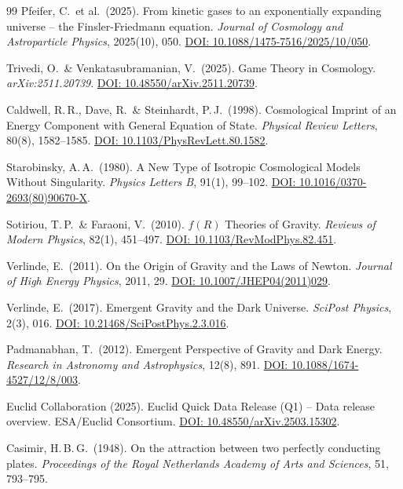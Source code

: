 \documentclass[aps,prd,twocolumn,superscriptaddress,nofootinbib]{revtex4-2}
\begin{document}
\begin{thebibliography}{99}
Pfeifer, C.\ et al.\ (2025).
From kinetic gases to an exponentially expanding universe -- the Finsler-Friedmann equation.
\textit{Journal of Cosmology and Astroparticle Physics}, 2025(10), 050.
\href{https://doi.org/10.1088/1475-7516/2025/10/050}{DOI: 10.1088/1475-7516/2025/10/050}.

Trivedi, O.\ \& Venkatasubramanian, V.\ (2025).
Game Theory in Cosmology.
\textit{arXiv:2511.20739}.
\href{https://doi.org/10.48550/arXiv.2511.20739}{DOI: 10.48550/arXiv.2511.20739}.

Caldwell, R.\,R., Dave, R.\ \& Steinhardt, P.\,J.\ (1998).
Cosmological Imprint of an Energy Component with General Equation of State.
\textit{Physical Review Letters}, 80(8), 1582--1585.
\href{https://doi.org/10.1103/PhysRevLett.80.1582}{DOI: 10.1103/PhysRevLett.80.1582}.

Starobinsky, A.\,A.\ (1980).
A New Type of Isotropic Cosmological Models Without Singularity.
\textit{Physics Letters B}, 91(1), 99--102.
\href{https://doi.org/10.1016/0370-2693(80)90670-X}{DOI: 10.1016/0370-2693(80)90670-X}.

Sotiriou, T.\,P.\ \& Faraoni, V.\ (2010).
$f(R)$ Theories of Gravity.
\textit{Reviews of Modern Physics}, 82(1), 451--497.
\href{https://doi.org/10.1103/RevModPhys.82.451}{DOI: 10.1103/RevModPhys.82.451}.

Verlinde, E.\ (2011).
On the Origin of Gravity and the Laws of Newton.
\textit{Journal of High Energy Physics}, 2011, 29.
\href{https://doi.org/10.1007/JHEP04(2011)029}{DOI: 10.1007/JHEP04(2011)029}.

Verlinde, E.\ (2017).
Emergent Gravity and the Dark Universe.
\textit{SciPost Physics}, 2(3), 016.
\href{https://doi.org/10.21468/SciPostPhys.2.3.016}{DOI: 10.21468/SciPostPhys.2.3.016}.

Padmanabhan, T.\ (2012).
Emergent Perspective of Gravity and Dark Energy.
\textit{Research in Astronomy and Astrophysics}, 12(8), 891.
\href{https://doi.org/10.1088/1674-4527/12/8/003}{DOI: 10.1088/1674-4527/12/8/003}.

Euclid Collaboration (2025).
Euclid Quick Data Release (Q1) -- Data release overview.
ESA/Euclid Consortium.
\href{https://doi.org/10.48550/arXiv.2503.15302}{DOI: 10.48550/arXiv.2503.15302}.

Casimir, H.\,B.\,G.\ (1948).
On the attraction between two perfectly conducting plates.
\textit{Proceedings of the Royal Netherlands Academy of Arts and Sciences}, 51, 793--795.


\end{thebibliography}
\end{document}
